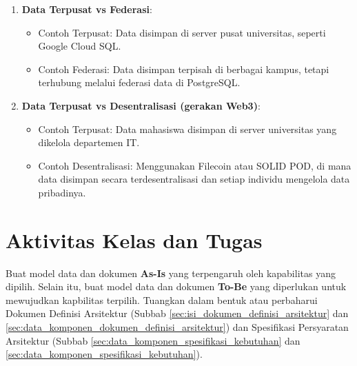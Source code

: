 \begin{enumerate}
	\item \textbf{Data Terpusat vs Federasi}: 
	\begin{itemize}
		\item Contoh Terpusat: Data disimpan di server pusat universitas, seperti Google Cloud SQL.
		\item Contoh Federasi: Data disimpan terpisah di berbagai kampus, tetapi terhubung melalui federasi data di PostgreSQL.
	\end{itemize}
	
	\item \textbf{Data Terpusat vs Desentralisasi (gerakan Web3)}: 
	\begin{itemize}
		\item Contoh Terpusat: Data mahasiswa disimpan di server universitas yang dikelola departemen IT.
		\item Contoh Desentralisasi: Menggunakan Filecoin atau SOLID POD, di mana data disimpan secara terdesentralisasi dan setiap individu mengelola data pribadinya.
	\end{itemize}
\end{enumerate}

\section{Aktivitas Kelas dan Tugas}
Buat model data dan dokumen \textbf{As-Is} yang terpengaruh oleh kapabilitas yang dipilih. Selain itu, buat model data dan dokumen \textbf{To-Be} yang diperlukan untuk mewujudkan kapbilitas terpilih. Tuangkan dalam bentuk atau perbaharui Dokumen Definisi Arsitektur (Subbab \ref{sec:isi_dokumen_definisi_arsitektur} dan \ref{sec:data_komponen_dokumen_definisi_arsitektur}) dan Spesifikasi Persyaratan Arsitektur (Subbab \ref{sec:data_komponen_spesifikasi_kebutuhan} dan  \ref{sec:data_komponen_spesifikasi_kebutuhan}).
